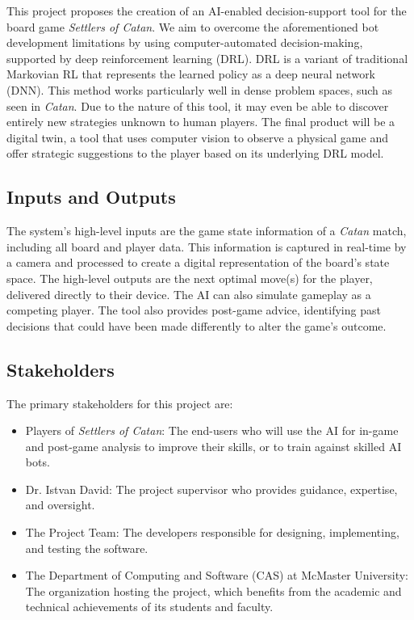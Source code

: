 \documentclass{article}
\begin{document}
This project proposes the creation of an AI-enabled decision-support tool for the board game \emph{Settlers of Catan}.
We aim to overcome the aforementioned bot development limitations by using computer-automated decision-making, supported by deep reinforcement learning (DRL).
DRL is a variant of traditional Markovian RL that represents the learned policy as a deep neural network (DNN).
This method works particularly well in dense problem spaces, such as seen in \emph{Catan}.
Due to the nature of this tool, it may even be able to discover entirely new strategies unknown to human players.
The final product will be a digital twin, a tool that uses computer vision to observe a physical game and offer strategic suggestions to the player based on its underlying DRL model.

\subsection{Inputs and Outputs}\label{subsec:inputs-and-outputs}
The system's high-level inputs are the game state information of a \emph{Catan} match, including all board and player data.
This information is captured in real-time by a camera and processed to create a digital representation of the board's state space.
The high-level outputs are the next optimal move(s) for the player, delivered directly to their device.
The AI can also simulate gameplay as a competing player.
The tool also provides post-game advice, identifying past decisions that could have been made differently to alter the game's outcome.

\subsection{Stakeholders}\label{subsec:stakeholders}
The primary stakeholders for this project are:
\begin{itemize}
    \item Players of \emph{Settlers of Catan}: The end-users who will use the AI for in-game and post-game analysis to improve their skills, or to train against skilled AI bots.
    \item Dr. Istvan David: The project supervisor who provides guidance, expertise, and oversight.
    \item The Project Team: The developers responsible for designing, implementing, and testing the software.
    \item The Department of Computing and Software (CAS) at McMaster University: The organization hosting the project, which benefits from the academic and technical achievements of its students and faculty.
\end{itemize}
\end{document}
